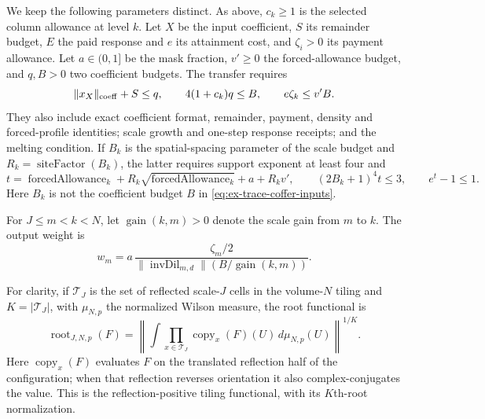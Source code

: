 We keep the following parameters distinct. As above, \(c_k\geq1\) is the
selected column allowance at level \(k\). Let \(X\) be the input coefficient, \(S\) its remainder budget,
\(E\) the paid response and \(e\) its attainment cost, and
\(\zeta_i>0\) its payment allowance. Let \(a\in(0,1]\) be the mask fraction,
\(v'\geq0\) the forced-allowance budget, and \(q,B>0\) two coefficient budgets.
The transfer requires
\begin{equation}
 \|x_X\|_{\rm coeff}+S\leq q,\qquad
 4(1+c_k)q\leq B,\qquad e\zeta_k\leq v'B.
 \label{eq:ex-trace-coffer-inputs}
\end{equation}
They also include exact coefficient format, remainder, payment, density and
forced-profile identities; scale growth and one-step response receipts; and
the melting condition. If \(B_k\) is the spatial-spacing parameter of the
scale budget and \(R_k=\operatorname{siteFactor}(B_k)\), the latter requires
support exponent at least four and
\[
 t=\operatorname{forcedAllowance}_k
  +R_k\sqrt{\operatorname{forcedAllowance}_k}+a+R_kv',\qquad
 (2B_k+1)^4t\leq3,\qquad e^t-1\leq1.
\]
Here \(B_k\) is not the coefficient budget \(B\) in
\eqref{eq:ex-trace-coffer-inputs}.

For \(J\leq m<k<N\), let \(\operatorname{gain}(k,m)>0\) denote the
scale gain from \(m\) to \(k\). The output weight is
\begin{equation}
 w_m=a\,\frac{\zeta_m/2}
 {\|\operatorname{invDil}_{m,d}\|(B/\operatorname{gain}(k,m))}.
 \label{eq:ex-trace-coffer-weight}
\end{equation}

For clarity, if \(\mathcal T_J\) is the set of reflected scale-\(J\) cells
in the volume-\(N\) tiling and \(K=|\mathcal T_J|\), with \(\mu_{N,p}\) the normalized Wilson measure, the root functional is
\[
 \operatorname{root}_{J,N,p}(F)=
 \left\|\int\prod_{x\in\mathcal T_J}
       \operatorname{copy}_x(F)(U)\,d\mu_{N,p}(U)\right\|^{1/K}.
\]
Here \(\operatorname{copy}_x(F)\) evaluates \(F\) on the translated
reflection half of the configuration; when that reflection reverses
orientation it also complex-conjugates the value. This is the
reflection-positive tiling functional, with its \(K\)th-root normalization.

